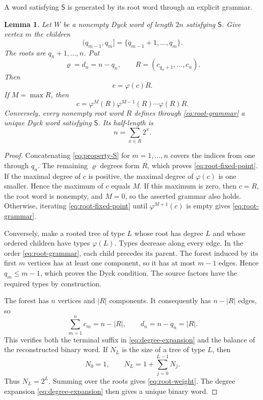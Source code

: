 \documentclass[11pt]{article}
\newtheorem{lemma}[theorem]{Lemma}
\theoremstyle{definition}
\theoremstyle{remark}
\begin{document}
A word satisfying $\mathsf S$ is generated by its root word through an explicit grammar.
\begin{lemma}
\label{lem:root-grammar}
Let \(W\) be a nonempty Dyck word of length \(2n\) satisfying \(\mathsf S\).
Give vertex \(m\) the children
\[
 (q_{m-1},q_m]=\{q_{m-1}+1,\ldots,q_m\}.
\]
The roots are \(q_n+1,\ldots,n\).  Put
\[
 \varrho=d_n=n-q_n,
 \qquad R=(c_{q_n+1},\ldots,c_n).
\]
Then
\begin{equation}
\label{eq:root-fixed-point}
 c=\varphi(c)R.
\end{equation}
If \(M=\max R\), then
\begin{equation}
\label{eq:root-grammar}
 c=\varphi^M(R)\varphi^{M-1}(R)\cdots\varphi(R)R.
\end{equation}
Conversely, every nonempty root word \(R\) defines through
\eqref{eq:root-grammar} a unique Dyck word satisfying \(\mathsf S\).  Its
half-length is
\begin{equation}
\label{eq:root-weight}
 n=\sum_{x\in R}2^x.
\end{equation}
\end{lemma}

\begin{proof}
Concatenating \eqref{eq:property-S} for \(m=1,\ldots,n\) covers the indices
from one through \(q_n\).  The remaining \(\varrho\) degrees form \(R\),
which proves \eqref{eq:root-fixed-point}.  If the maximal degree of \(c\) is
positive, the maximal degree of \(\varphi(c)\) is one smaller.  Hence the
maximum of \(c\) equals \(M\).  If this maximum is zero, then \(c=R\), the
root word is nonempty, and \(M=0\), so the asserted grammar also holds.
Otherwise, iterating \eqref{eq:root-fixed-point} until
\(\varphi^{M+1}(c)\) is empty gives \eqref{eq:root-grammar}.

Conversely, make a rooted tree of type \(L\) whose root has degree \(L\) and
whose ordered children have types \(\varphi(L)\).  Types decrease along every
edge.  In the order \eqref{eq:root-grammar}, each child precedes its parent.
The forest induced by its first \(m\) vertices has at least one component, so
it has at most \(m-1\) edges.  Hence \(q_m\leq m-1\), which proves the Dyck
condition.  The source factors have the required types by construction.

The forest has \(n\) vertices and \(|R|\) components.  It consequently has
\(n-|R|\) edges, so
\[
 \sum_{m=1}^n c_m=n-|R|,
 \qquad d_n=n-q_n=|R|.
\]
This verifies both the terminal suffix in \eqref{eq:degree-expansion} and the
balance of the reconstructed binary word.  If \(N_L\) is the size of a tree
of type \(L\), then
\[
 N_0=1,
 \qquad N_L=1+\sum_{j=0}^{L-1}N_j.
\]
Thus \(N_L=2^L\).  Summing over the roots gives
\eqref{eq:root-weight}.  The degree expansion \eqref{eq:degree-expansion}
then gives a unique binary word.
\end{proof}
\end{document}

